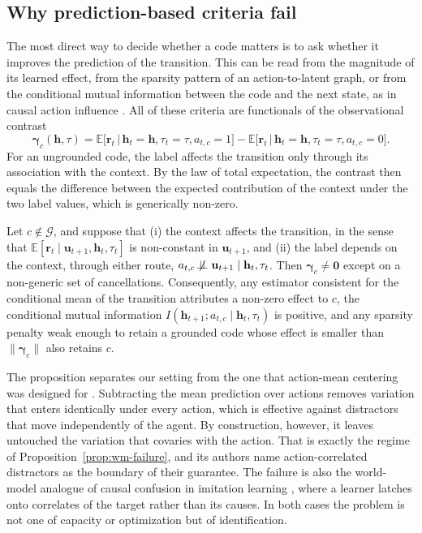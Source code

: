 \subsection{Why prediction-based criteria fail}
\label{sec:wm-failure}

The most direct way to decide whether a code matters is to ask whether it improves the prediction of the transition. This can be read from the magnitude of its learned effect, from the sparsity pattern of an action-to-latent graph, or from the conditional mutual information between the code and the next state, as in causal action influence \citep{seitzer2021cai}. All of these criteria are functionals of the observational contrast
\begin{equation}
\label{eq:wm-contrast}
\boldsymbol{\gamma}_c(\mathbf{h},\tau)=\mathbb{E}\big[\mathbf{r}_t\,\big|\,\mathbf{h}_t=\mathbf{h},\tau_t=\tau,a_{t,c}=1\big]-\mathbb{E}\big[\mathbf{r}_t\,\big|\,\mathbf{h}_t=\mathbf{h},\tau_t=\tau,a_{t,c}=0\big].
\end{equation}
For an ungrounded code, the label affects the transition only through its association with the context. By the law of total expectation, the contrast then equals the difference between the expected contribution of the context under the two label values, which is generically non-zero.

\begin{proposition}
\label{prop:wm-failure}
Let $c\notin\mathcal{G}$, and suppose that (i) the context affects the transition, in the sense that $\mathbb{E}[\mathbf{r}_t\mid\mathbf{u}_{t+1},\mathbf{h}_t,\tau_t]$ is non-constant in $\mathbf{u}_{t+1}$, and (ii) the label depends on the context, through either route, $a_{t,c}\not\!\perp\!\!\!\perp\mathbf{u}_{t+1}\mid\mathbf{h}_t,\tau_t$. Then $\boldsymbol{\gamma}_c\neq\mathbf{0}$ except on a non-generic set of cancellations. Consequently, any estimator consistent for the conditional mean of the transition attributes a non-zero effect to $c$, the conditional mutual information $I(\mathbf{h}_{t+1};a_{t,c}\mid\mathbf{h}_t,\tau_t)$ is positive, and any sparsity penalty weak enough to retain a grounded code whose effect is smaller than $\|\boldsymbol{\gamma}_c\|$ also retains $c$.
\end{proposition}

The proposition separates our setting from the one that action-mean centering was designed for \citep{li2026dueling}. Subtracting the mean prediction over actions removes variation that enters identically under every action, which is effective against distractors that move independently of the agent. By construction, however, it leaves untouched the variation that covaries with the action. That is exactly the regime of Proposition~\ref{prop:wm-failure}, and its authors name action-correlated distractors as the boundary of their guarantee. The failure is also the world-model analogue of causal confusion in imitation learning \citep{dehaan2019causal}, where a learner latches onto correlates of the target rather than its causes. In both cases the problem is not one of capacity or optimization but of identification.

